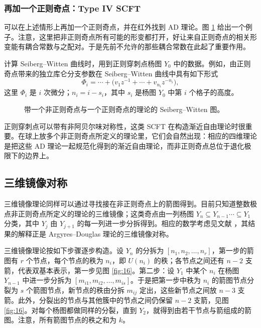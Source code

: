 \subsubsection{再加一个正则奇点：Type IV SCFT}
\label{sec:6.1.4}

可以在上述情形上再加一个正则奇点，并在红外找到 AD 理论。图 \ref{fig:15} 给出一个例子。注意，这里把非正则奇点所有可能的形变都打开，好让来自正则奇点的相关形变能有耦合常数与之配对。于是先前不允许的那些耦合常数在此起了重要作用。

计算 Seiberg--Witten 曲线时，用到正则穿刺点杨图 $Y_0$ 中的数据。例如，由正则奇点带来的独立库仑分支参数在 Seiberg--Witten 曲线中具有如下形式
\begin{equation}
\Phi_i = \cdots+\bigl(v_1z^{-1}+\cdots+v_{n_i}z^{-n_i}\bigr) ,
\label{eq:6.27}\tag{6.27}
\end{equation}
这里 $\Phi_i$ 是 $i$ 次微分；$n_i=i-s_i$，其中 $s_i$ 是杨图 $Y_0$ 中第 $i$ 个格子的高度。

\begin{figure}[tbp]
\centering

\caption{带一个非正则奇点与一个正则奇点的理论的 Seiberg--Witten 图。}
\label{fig:15}
\end{figure}

正则穿刺点可以带有非阿贝尔味对称性，这类 SCFT 在构造渐近自由理论时很重要。在球上放多个非正则奇点所定义的理论里，它们会自然出现：相应的四维理论是把这些 AD 理论一起规范化得到的渐近自由理论，而非正则奇点总位于退化极限下的边界上。

\subsection{三维镜像对称}
\label{sec:6.2}

三维镜像理论同样可以通过寻找接在非正则奇点上的箭图得到。目前只知道整数极点非正则奇点所定义的理论的三维镜像；这类奇点由一列杨图 $Y_n\subseteq Y_{n-1}\cdots\subseteq Y_1$ 分类，其中 $Y_j$ 由 $Y_{j+1}$ 的每一列进一步分拆得到。相应的数学考虑见文献 \cite{39}，其结果的解释正是 Argyres--Douglas 理论的三维镜像对称。


三维镜像理论按如下步骤逐步构造。设 $Y_n$ 的分拆为 $[n_1,n_2,\dots,n_r]$，第一步的箭图有 $r$ 个节点，每个节点的秩为 $n_i$，即 $U(n_i)$ 的秩；各节点之间还有 $n-2$ 支箭，代表双基本表示，第一步见图 \ref{fig:16}。第二步：设 $Y_1$ 中某个 $n_i$ 在杨图 $Y_{n-1}$ 中进一步分拆为 $[m_{i1},m_{i2},\dots,m_{is}]$。于是把第一步中秩为 $n_i$ 的箭图节点分裂为 $s$ 个箭图节点，新节点的秩由分拆 $m_{ij}$ 定出，这些新节点之间放 $n-3$ 支箭。此外，分裂出的节点与其他簇中的节点之间仍保留 $n-2$ 支箭，见图 \ref{fig:16}。对每个杨图都做同样的分裂，直到 $Y_2$，就得到由若干节点与箭组成的箭图。注意，所有箭图节点的秩之和为 $k$。

